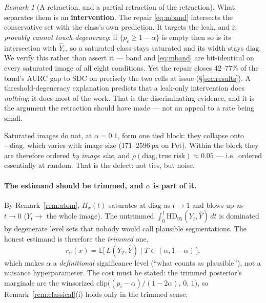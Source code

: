 \documentclass[11pt]{article}
\theoremstyle{remark}
\newtheorem{remark}{Remark}
\newcommand{\Yhat}{\widehat{Y}}
\newcommand{\HDF}{\mathrm{HD}_{95}}
\newcommand{\Ex}{\mathbb{E}}
\newcommand{\diag}{\mathrm{diag}}
\begin{document}
\begin{remark}[A retraction, and a partial retraction of the retraction]
What separates them is an \textbf{intervention}. The repair
\eqref{eq:mband} intersects the conservative set with the class's own prediction. It
targets the leak, and it \emph{provably cannot touch degeneracy}: if
$\{p_c \ge 1-\alpha\}$ is empty then so is its intersection with $\Yhat_c$, so a
saturated class stays saturated and its width stays $\diag$. We verify this rather
than assert it --- band and \eqref{eq:mband} are bit-identical on every saturated
image of all eight conditions. Yet the repair closes $42$--$77\%$ of the band's AURC
gap to SDC on precisely the two cells at issue (\S\ref{sec:results}). A
threshold-degeneracy explanation predicts that a leak-only intervention does
\emph{nothing}; it does most of the work. That is the discriminating evidence, and
it is the argument the retraction should have made --- not an appeal to a rate being
small.
\end{remark}

Saturated images do not, at $\alpha=0.1$, form one tied block: they collapse onto
$-\diag$, which varies with image size ($171$--$2596$\,px on Pet). Within the
block they are therefore ordered \emph{by image size}, and
$\rho(\diag, \text{true risk}) \approx 0.05$ --- i.e.\ ordered essentially at
random. That is the defect: not ties, but noise.

\paragraph{The estimand should be trimmed, and $\alpha$ is part of it.} By
Remark~\ref{rem:atom}, $H_x(t)$ saturates at $\diag$ as $t\to 1$ and blows up as
$t\to 0$ ($Y_t\to$ the whole image). The untrimmed
$\int_0^1 \HDF(Y_t,\Yhat)\,dt$ is dominated by degenerate level sets that nobody
would call plausible segmentations. The honest estimand is therefore the
\emph{trimmed} one,
\begin{equation}\label{eq:trimmed}
r_\alpha(x) = \Ex\big[\,L(Y_T,\Yhat)\;\big|\; T\in(\alpha,1-\alpha)\,\big],
\end{equation}
which makes $\alpha$ a \emph{definitional} significance level (``what counts as
plausible''), not a nuisance hyperparameter. The cost must be stated: the trimmed
posterior's marginals are the winsorized
$\mathrm{clip}\big((p_i-\alpha)/(1-2\alpha),\,0,\,1\big)$, so
Remark~\ref{rem:classical}(i) holds only in the trimmed sense.
\end{document}
